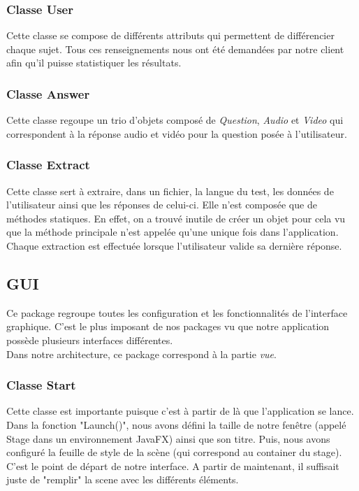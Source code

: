 \subsubsection{Classe User}

Cette classe se compose de différents attributs qui permettent de différencier chaque sujet. Tous ces renseignements nous ont été demandées par notre client afin qu'il puisse statistiquer les résultats.

\subsubsection{Classe Answer}

Cette classe regoupe un trio d'objets composé de \textit{Question}, \textit{Audio} et \textit{Video} qui correspondent à la réponse audio et vidéo pour la question posée à l'utilisateur.

\subsubsection{Classe Extract}

Cette classe sert à extraire, dans un fichier, la langue du test, les données de l'utilisateur ainsi que les réponses de celui-ci. Elle n'est composée que de méthodes statiques. En effet, on a trouvé inutile de créer un objet pour cela vu que la méthode principale n'est appelée qu'une unique fois dans l'application. Chaque extraction est effectuée lorsque l'utilisateur valide sa dernière réponse.

\subsection{GUI}

Ce package regroupe toutes les configuration et les fonctionnalités de l'interface graphique. C'est le plus imposant de nos packages vu que notre application possède plusieurs interfaces différentes.\\
Dans notre architecture, ce package correspond à la partie \textit{vue}.

\subsubsection{Classe Start}

Cette classe est importante puisque c'est à partir de là que l'application se lance. Dans la fonction "Launch()", nous avons défini la taille de notre fenêtre (appelé Stage dans un environnement JavaFX) ainsi que son titre. Puis, nous avons configuré la feuille de style de la scène (qui correspond au container du stage). C'est le point de départ de notre interface. A partir de maintenant, il suffisait juste de "remplir" la scene avec les différents éléments.

